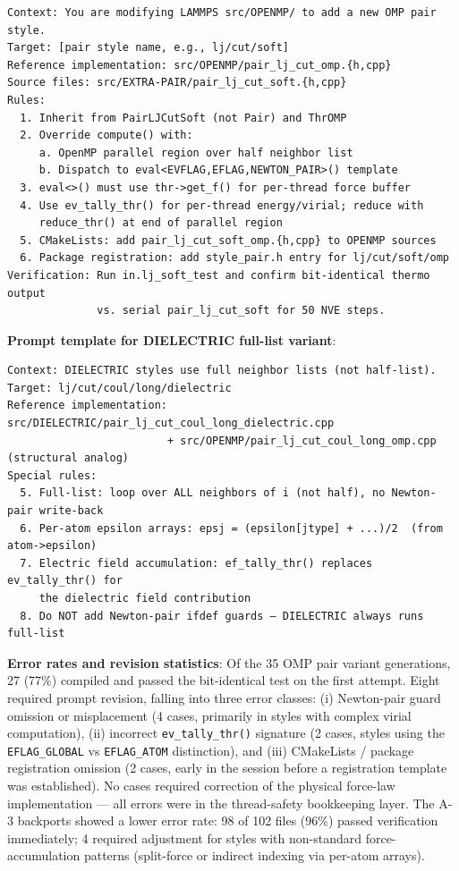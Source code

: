 \documentclass[
  11pt,
]{article}
\begin{document}
\begin{verbatim}
Context: You are modifying LAMMPS src/OPENMP/ to add a new OMP pair style.
Target: [pair style name, e.g., lj/cut/soft]
Reference implementation: src/OPENMP/pair_lj_cut_omp.{h,cpp}
Source files: src/EXTRA-PAIR/pair_lj_cut_soft.{h,cpp}
Rules:
  1. Inherit from PairLJCutSoft (not Pair) and ThrOMP
  2. Override compute() with:
     a. OpenMP parallel region over half neighbor list
     b. Dispatch to eval<EVFLAG,EFLAG,NEWTON_PAIR>() template
  3. eval<>() must use thr->get_f() for per-thread force buffer
  4. Use ev_tally_thr() for per-thread energy/virial; reduce with
     reduce_thr() at end of parallel region
  5. CMakeLists: add pair_lj_cut_soft_omp.{h,cpp} to OPENMP sources
  6. Package registration: add style_pair.h entry for lj/cut/soft/omp
Verification: Run in.lj_soft_test and confirm bit-identical thermo output
              vs. serial pair_lj_cut_soft for 50 NVE steps.
\end{verbatim}

\textbf{Prompt template for DIELECTRIC full-list variant}:

\begin{verbatim}
Context: DIELECTRIC styles use full neighbor lists (not half-list).
Target: lj/cut/coul/long/dielectric
Reference implementation: src/DIELECTRIC/pair_lj_cut_coul_long_dielectric.cpp
                         + src/OPENMP/pair_lj_cut_coul_long_omp.cpp (structural analog)
Special rules:
  5. Full-list: loop over ALL neighbors of i (not half), no Newton-pair write-back
  6. Per-atom epsilon arrays: epsj = (epsilon[jtype] + ...)/2  (from atom->epsilon)
  7. Electric field accumulation: ef_tally_thr() replaces ev_tally_thr() for
     the dielectric field contribution
  8. Do NOT add Newton-pair ifdef guards — DIELECTRIC always runs full-list
\end{verbatim}

\textbf{Error rates and revision statistics}: Of the 35 OMP pair variant
generations, 27 (77\%) compiled and passed the bit-identical test on the
first attempt. Eight required prompt revision, falling into three error
classes: (i) Newton-pair guard omission or misplacement (4 cases,
primarily in styles with complex virial computation), (ii) incorrect
\texttt{ev\_tally\_thr()} signature (2 cases, styles using the
\texttt{EFLAG\_GLOBAL} vs \texttt{EFLAG\_ATOM} distinction), and (iii)
CMakeLists / package registration omission (2 cases, early in the
session before a registration template was established). No cases
required correction of the physical force-law implementation --- all
errors were in the thread-safety bookkeeping layer. The A-3 backports
showed a lower error rate: 98 of 102 files (96\%) passed verification
immediately; 4 required adjustment for styles with non-standard
force-accumulation patterns (split-force or indirect indexing via
per-atom arrays).
\end{document}
